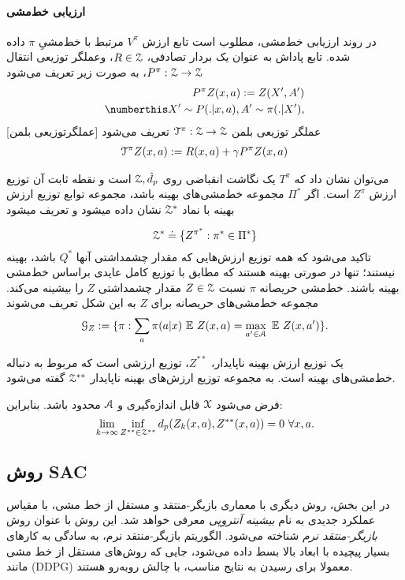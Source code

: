 \paragraph{ارزیابی خط‌مشی}
در روند ارزیابی خط‌مشی، مطلوب است تابع ارزش
$V^\pi$
مرتبط با خط‌مشیِ $\pi$ داده شده. 
تابع پاداش به عنوان یک بردار تصادفی، 
$R \in \EuScript{Z}$،
وعملگر توزیعی انتقال 
$P^\pi : \EuScript{Z} \rightarrow \EuScript{Z}$،
به صورت زیر تعریف می‌شود
\begin{align}
P^{\pi} Z(x,a) := Z(X',A') \\ \numberthis
X' \sim P(.|x,a), A'\sim \pi (.|X'), \nonumber
\end{align}
[عملگرتوزیعی بلمن]
 عملگر توزیعی بلمن $\EuScript{T}^\pi : \EuScript{Z} \rightarrow \EuScript{Z}$ تعریف می‌شود
\begin{align}
	\EuScript{T}^\pi Z(x,a) := R(x,a)+ \gamma P^\pi Z(x,a)
\end{align}  



می‌توان نشان داد که $T^\pi$ یک نگاشت انقباضی 
روی
 $\EuScript{Z},\hat{d}_p$
  است و نقطه ثابت آن توزیع ارزش 
$Z^\pi$
    است.
اگر 
$\Pi^*$
مجموعه‌ خط‌مشی‌های بهینه باشد، 
مجموعه توابع توزیع ارزش بهینه با نماد $\EuScript{Z}^*$ نشان داده می\nf شود و تعریف می\nf شود

$$\EuScript{Z}^* \doteq \{{Z^{\pi^{*}} : \pi^* \in \Pi^*\} }$$
تاکید می‌شود که همه توزیع ارزش‌هایی که مقدار چشمداشتی آن\nf ها
 $Q^*$ 
باشد، بهینه نیستند؛ تنها در صورتی بهینه هستند که مطابق با توزیع کامل عایدی بر‌اساس خط‌مشی بهینه باشند.
خط‌مشی حریصانه
$\pi$
نسبت
$Z \in \EuScript{Z}$
مقدار چشمداشتی
$Z$
 را بیشینه می‌کند.
 مجموعه خط‌مشی‌های حریصانه برای 
 $Z$
 به این شکل تعریف می‌شوند
 $$\EuScript{G}_Z := \lbrace \pi : \sum_{a} \pi (a|x) \ \mathbb{E} \ Z(x,a) = \max_{a' \in \EuScript{A}} \ \mathbb{E} \ Z(x,a') \rbrace.$$

یک توزیع ارزش بهینه ناپایدار،
$Z^{**}$،
توزیع ارزشی‌ است که مربوط به دنباله خط‌مشی‌های بهینه است. به مجموعه‌ توزیع ارزش‌های بهینه ناپایدار 
 $\EuScript{Z}^{**}$
 گفته می‌شود.

فرض می‌شود 
$\EuScript{X}$
قابل اندازه‌گیری و 
$\EuScript{A}$
محدود باشد.
بنابراین:
$$\lim_{k\to\infty} \inf_{Z^{**} \in \EuScript{Z}^{**}} d_p (Z_k (x,a), Z^{**}(x,a)) = 0  \ \forall x,a.$$

\subsection{روش SAC}
در این بخش، روش دیگری با معماری  بازیگر-منتقد و مستقل از خط مشی، با مقیاس عملکرد جدیدی به نام
\textit{بیشینه آنتروپی}
معرفی خواهد شد.
این روش با عنوان روش	
\textit{بازیگر-منتقد نرم}
شناخته می‌شود.
الگوریتم  بازیگر-منتقد نرم، به سادگی به کارهای بسیار پیچیده با ابعاد بالا بسط داده می‌شود، جایی که روش‌های مستقل از خط مشی‌ مانند
\lr(DDPG)
  معمولا برای رسیدن به نتایج مناسب، با چالش روبه‌رو هستند.
  
